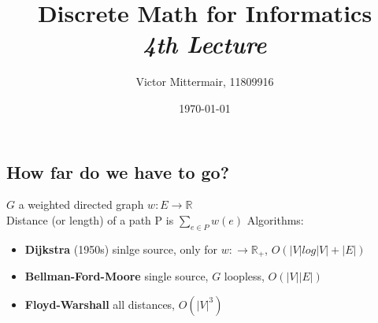 \documentclass{article}
\author{Victor Mittermair, 11809916}
\title{Discrete Math for Informatics\\
        \Large \emph{4th Lecture}}
\date{\today} %
\theoremstyle{definition}
\theoremstyle{remark}
\begin{document}
\maketitle
\thispagestyle{firstpage}

\begin{comment}
\section*{Graph}
\begin{tikzpicture}[node distance={30mm}, thick, main/.style = {draw, circle}]
    \centering
    \node[main] (1)              {}; 
    \node[main] (2) [right of=1] {};
    \node[main] (3) [below of=1] {}; 
    \node[main] (4) [right of=3] {};
    \draw (1) -- (2) ; 
    \draw (1) -- (3); 
    \draw (2) -- (4); 
    \draw (3) -- (4);
    \draw (3) -- (2) node [midway, fill=white] {$e$}; 
\end{tikzpicture}

\end{comment}
\subsection*{How far do we have to go?}
$G$ a weighted directed graph $w: E \rightarrow \mathbb{R}$\\
Distance (or length) of a path P is $\sum_{e \in P} w(e)$ 
Algorithms:
\begin{itemize}
    \item \textbf{Dijkstra} (1950s) sinlge source, only for $w: \rightarrow \mathbb{R_+}$, $O(|V|log|V|+|E|)$
    \item \textbf{Bellman-Ford-Moore} single source, $G$ loopless, $O(|V||E|)$
    \item \textbf{Floyd-Warshall} all distances, $O(|V|^3)$
\end{itemize}
\end{document}
